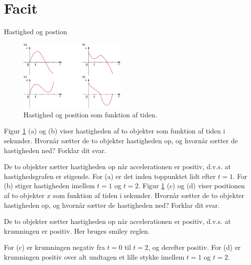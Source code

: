 \section{Facit}
\setcounter{opgave}{0}

\begin{opgave}{Hastighed og postion}
	\begin{figure}[h!]
		\centering
		\includegraphics[width=0.47\textwidth]{opg/figurer/vx_grafer.png}
		\caption{Hastighed og position som funktion af tiden.}
		\label{fig:vx_grafer}
	\end{figure}
	\opg Figur \ref{fig:vx_grafer} (a) og (b) viser hastigheden af to objekter som funktion af tiden i sekunder. Hvornår sætter de to objekter hastigheden op, og hvornår sætter de hastigheden ned? Forklar dit svar.
	
	De to objekter sætter hastigheden op når accelerationen er positiv, d.v.s. at hastighedsgrafen er stigende.
	For (a) er det inden toppunktet lidt efter $t=1$.
	For (b) stiger hastigheden imellem $t=1$ og $t=2$.
	\opg Figur \ref{fig:vx_grafer} (c) og (d) viser positionen af to objekter $x$ som funktion af tiden i sekunder. Hvornår sætter de to objekter hastigheden op, og hvornår sætter de hastigheden ned? Forklar dit svar.
	
	De to objekter sætter hastigheden op når accelerationen er positiv, d.v.s. at krumningen er positiv. Her bruges smiley reglen.
	
	For (c) er krumningen negativ fra $t=0$ til $t=2$, og derefter positiv.
	For (d) er krumningen positiv over alt undtagen et lille stykke imellem $t=1$ og $t=2$.
\end{opgave}
